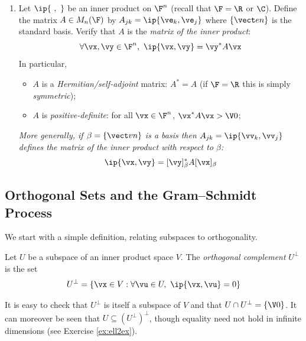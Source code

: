 \begin{exercises}
\begin{enumerate}
  (\emph{Hint: If complex functions are scary, use Euler's formula $e^{i mx}=\cos mx+i\sin mx$ and work with the real-valued functions $\cos mx$ and $\sin mx$. The difficulty is that you then need integration by parts\ldots})
  
  \item Let $\ip{\ ,\ }$ be an inner product on $\F^n$ (recall that $\F=\R$ or $\C$). Define the matrix $A\in M_n(\F)$ by $A_{jk}=\ip{\ve_k,\ve_j}$ where $\{\vect en\}$ is the standard basis. Verify that $A$ is the \emph{matrix of the inner product}:
  \[\forall \vx,\vy\in\F^n,\ \ip{\vx,\vy}=\vy^*A\vx\]
	In particular,
  \begin{itemize}
    \item $A$ is a \emph{Hermitian/self-adjoint} matrix: $A^*=A$ (if $\F=\R$ this is simply \emph{symmetric});
    \item $A$ is \emph{positive-definite}: for all $\vx\in\F^n$, $\vx^*A\vx>\V0$;
  \end{itemize}
  \emph{More generally, if $\beta=\{\vect vn\}$ is a basis then $A_{jk}=\ip{\vv_k,\vv_j}$ defines the matrix of the inner product with respect to $\beta$:
  \[\ip{\vx,\vy}=[\vy]_\beta^*A[\vx]_\beta\]}

\end{enumerate}
\end{exercises}
\clearpage


\subsection{Orthogonal Sets and the Gram--Schmidt Process}\label{sec:gs}

% 
% 

We start with a simple definition, relating subspaces to orthogonality. 

\begin{defn}{}{}
Let $U$ be a subspace of an inner product space $V$. The \emph{orthogonal complement} $U^\perp$ is the set
\[U^\perp=\{\vx\in V:\forall\vu\in U,\ \ip{\vx,\vu}=0\}\]
\end{defn}

It is easy to check that $U^\perp$ is itself a subspace of $V$ and that $U\cap U^\perp=\{\V0\}$. It can moreover be seen that $U\subseteq (U^\perp)^\perp$, though equality need not hold in infinite dimensions (see Exercise \ref{ex:ell2ex}).

